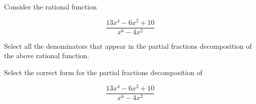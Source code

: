 \documentclass{ximera}
\author{Jason Miller}
\begin{document}
\begin{exercise}
Consider the rational function 

\[
\frac{13x^{4}-6x^{2}+10}{x^{6}-4x^{2}}
\]


Select all the denominators that appear in the partial fractions decomposition of the above rational function.

\begin{selectAll}
\end{selectAll}


\begin{exercise}

Select the correct form for the partial fractions decomposition of

\[ 
\frac{13x^{4}-6x^{2}+10}{x^{6}-4x^{2}}
\]

  \begin{multipleChoice}
  \end{multipleChoice}






\end{exercise}
\end{exercise}
\end{document}
